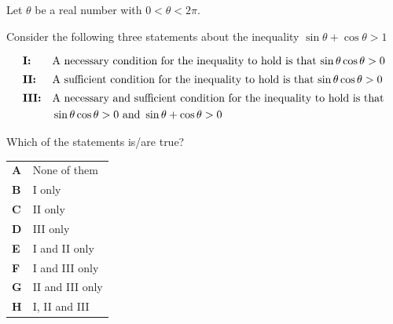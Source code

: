\documentclass[11pt,a4paper]{article}
\begin{document}
\begin{enumerate}[label=\textbf{\arabic*.},leftmargin=*,itemsep=0pt,start=7]
\questionitem[Logic]
Let $\theta$ be a real number with $0 < \theta < 2\pi$.

Consider the following three statements about the inequality \(\sin\theta + \cos\theta > 1\)

\[
\begin{array}{@{}l l@{}}
\textbf{I:} & \text{A necessary condition for the inequality to hold is that $\sin\theta\cos\theta > 0$} \\[5pt]
\textbf{II:} & \text{A sufficient condition for the inequality to hold is that $\sin\theta\cos\theta > 0$} \\[5pt]
\textbf{III:} &
\begin{aligned}[t]
&\text{A necessary and sufficient condition for the inequality to hold is that} \\
&\sin\theta\cos\theta > 0 \text{ and } \sin\theta + \cos\theta > 0 
\end{aligned}
\end{array}
\]

Which of the statements is/are true?

\par\vspace*{12pt}
\begin{tabularx}{\linewidth}{@{}>{\bfseries}l Y@{}}
A &
None of them
\\[0.8em]
B &
I only
\\[0.8em]
C &
II only
\\[0.8em]
D &
III only
\\[0.8em]
E &
I and II only
\\[0.8em]
F &
I and III only
\\[0.8em]
G &
II and III only
\\[0.8em]
H &
I, II and III
\\
\end{tabularx}
\end{enumerate}
\clearpage
\thispagestyle{djspaper}
\vspace*{8pt}
\end{document}
